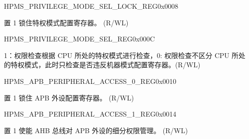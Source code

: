 



\begin{register}{H}{PMS\_PRIVILEGE\_MODE\_SEL\_LOCK\_REG}{0x0008}\label{regdesc:PMSPRIVILEGEMODESELLOCKREG}
%
%
\regnewline%
\begin{regdesc}\begin{reglist}
\label{fielddesc:PMSPRIVILEGEMODESELLOCK}\item [PMS\_PRIVILEGE\_MODE\_SEL\_LOCK] 置 1 锁住特权模式配置寄存器。 (R/WL)
\end{reglist}\end{regdesc}
\end{register}


\begin{register}{H}{PMS\_PRIVILEGE\_MODE\_SEL\_REG}{0x000C}\label{regdesc:PMSPRIVILEGEMODESELREG}
%
%
\regnewline%
\begin{regdesc}\begin{reglist}
\label{fielddesc:PMSPRIVILEGEMODESEL}\item [PMS\_PRIVILEGE\_MODE\_SEL] 1：权限检查根据 CPU 所处的特权模式进行检查，0: 权限检查不区分 CPU 所处的特权模式，此时只检查是否违反机器模式配置寄存器。(R/WL)
\end{reglist}\end{regdesc}
\end{register}


\begin{register}{H}{PMS\_APB\_PERIPHERAL\_ACCESS\_0\_REG}{0x0010}\label{regdesc:PMSAPBPERIPHERALACCESS0REG}
%
%
\regnewline%
\begin{regdesc}\begin{reglist}
\label{fielddesc:PMSAPBPERIPHERALACCESSLOCK}\item [PMS\_APB\_PERIPHERAL\_ACCESS\_LOCK] 置 1 锁住 APB 外设配置寄存器。 (R/WL)
\end{reglist}\end{regdesc}
\end{register}


\begin{register}{H}{PMS\_APB\_PERIPHERAL\_ACCESS\_1\_REG}{0x0014}\label{regdesc:PMSAPBPERIPHERALACCESS1REG}
%
%
\regnewline%
\begin{regdesc}\begin{reglist}
\label{fielddesc:PMSAPBPERIPHERALACCESSSPLITBURST}\item [PMS\_APB\_PERIPHERAL\_ACCESS\_SPLIT\_BURST] 置 1 使能 AHB 总线对 APB 外设的细分权限管理。 (R/WL)
\end{reglist}\end{regdesc}
\end{register}


